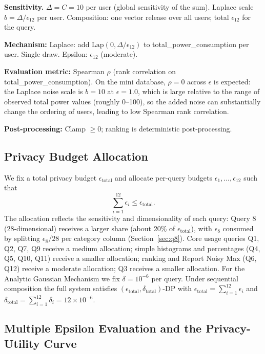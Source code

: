 \documentclass[12pt,letterpaper]{article}
\begin{document}
\textbf{Sensitivity.} $\Delta = C = 10$ per user (global sensitivity of the sum). Laplace scale $b = \Delta/\epsilon_{12}$ per user. Composition: one vector release over all users; total $\epsilon_{12}$ for the query.

\textbf{Mechanism:} Laplace: add $\text{Lap}(0, \Delta/\epsilon_{12})$ to total\_power\_consumption per user. Single draw. Epsilon: $\epsilon_{12}$ (moderate).

\textbf{Evaluation metric:} Spearman $\rho$ (rank correlation on total\_power\_consumption). On the mini database, $\rho = 0$ across $\epsilon$ is expected: the Laplace noise scale is $b = 10$ at $\epsilon = 1.0$, which is large relative to the range of observed total power values (roughly 0--100), so the added noise can substantially change the ordering of users, leading to low Spearman rank correlation.

\textbf{Post-processing:} Clamp $\geq 0$; ranking is deterministic post-processing.

\subsection{Privacy Budget Allocation}
\label{sec:budget}

We fix a total privacy budget $\epsilon_{\text{total}}$ and allocate per-query budgets $\epsilon_1, \ldots, \epsilon_{12}$ such that
\[
\sum_{i=1}^{12} \epsilon_i \leq \epsilon_{\text{total}}.
\]
The allocation reflects the sensitivity and dimensionality of each query: Query 8 (28-dimensional) receives a larger share (about 20\% of $\epsilon_{\text{total}}$), with $\epsilon_8$ consumed by splitting $\epsilon_8/28$ per category column (Section~\ref{sec:q8}). Core usage queries Q1, Q2, Q7, Q9 receive a medium allocation; simple histograms and percentages (Q4, Q5, Q10, Q11) receive a smaller allocation; ranking and Report Noisy Max (Q6, Q12) receive a moderate allocation; Q3 receives a smaller allocation. For the Analytic Gaussian Mechanism we fix $\delta = 10^{-6}$ per query. Under sequential composition the full system satisfies $(\epsilon_{\text{total}}, \delta_{\text{total}})$-DP with $\epsilon_{\text{total}} = \sum_{i=1}^{12} \epsilon_i$ and $\delta_{\text{total}} = \sum_{i=1}^{12} \delta_i = 12 \times 10^{-6}$.

\subsection{Multiple Epsilon Evaluation and the Privacy-Utility Curve}
\label{sec:multi_epsilon}
\end{document}

